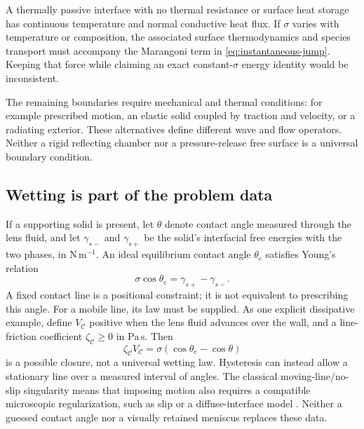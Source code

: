 A thermally passive interface with no thermal resistance or surface heat
storage has continuous temperature and normal conductive heat flux. If
$\sigma$ varies with temperature or composition, the associated surface
thermodynamics and species transport must accompany the Marangoni term in
\cref{eq:instantaneous-jump}. Keeping that force while claiming an exact
constant-$\sigma$ energy identity would be inconsistent.

The remaining boundaries require mechanical and thermal conditions: for
example prescribed motion, an elastic solid coupled by traction and velocity,
or a radiating exterior. These alternatives define different wave and flow
operators. Neither a rigid reflecting chamber nor a pressure-release free
surface is a universal boundary condition.

\subsection{Wetting is part of the problem data}
If a supporting solid is present, let $\theta$ denote contact angle measured
through the lens fluid, and let $\gamma_{s-}$ and $\gamma_{s+}$ be the solid's
interfacial free energies with the two phases, in $\mathrm{N\,m^{-1}}$. An ideal
equilibrium contact angle $\theta_e$ satisfies Young's relation
\begin{equation}
 \sigma\cos\theta_e=\gamma_{s+}-\gamma_{s-}.
 \label{eq:young-contact}
\end{equation}
A fixed contact line is a positional constraint; it is not equivalent to
prescribing this angle. For a mobile line, its law must be supplied. As one
explicit dissipative example, define $V_{\mathcal C}$ positive when the lens
fluid advances over the wall, and a line-friction coefficient
$\zeta_{\mathcal C}\geq0$ in $\mathrm{Pa\,s}$. Then
\begin{equation}
 \zeta_{\mathcal C}V_{\mathcal C}
   =\sigma(\cos\theta_e-\cos\theta)
 \label{eq:contact-friction}
\end{equation}
is a possible closure, not a universal wetting law. Hysteresis can instead
allow a stationary line over a measured interval of angles. The classical
moving-line/no-slip singularity means that imposing motion also requires a
compatible microscopic regularization, such as slip or a diffuse-interface
model \cite{huh1971,qian2006}. Neither a guessed contact angle nor a visually
retained meniscus replaces these data.

